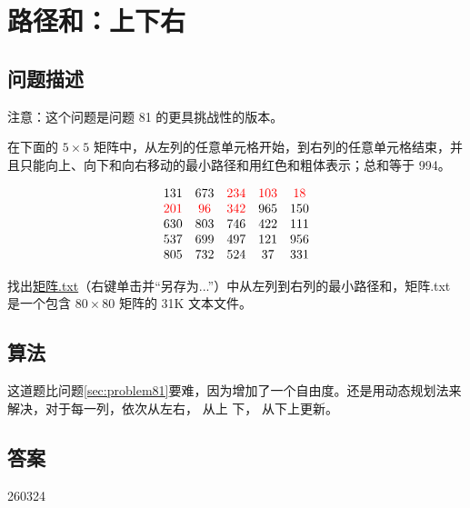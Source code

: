 \section{路径和：上下右}\label{sec:problem82}
\subsection{问题描述}
\begin{tcolorbox}

	注意：这个问题是问题 81 的更具挑战性的版本。

	在下面的 $5 \times 5$ 矩阵中，从左列的任意单元格开始，到右列的任意单元格结束，并且只能向上、向下和向右移动的最小路径和用红色和粗体表示；总和等于 994。

	\[
		\begin{array}{ccccc}
			131       & 673      & \textcolor{red}{234} & \textcolor{red}{103} & \textcolor{red}{18} \\
			\textcolor{red}{201} & \textcolor{red}{96} & \textcolor{red}{342} & 965       & 150      \\
			630       & 803      & 746       & 422       & 111      \\
			537       & 699      & 497       & 121       & 956      \\
			805       & 732      & 524       & 37        & 331      \\
		\end{array}
	\]

	找出\href{https://projecteuler.net/resources/documents/0082_matrix.txt}{矩阵.txt}（右键单击并“另存为...”）中从左列到右列的最小路径和，矩阵.txt 是一个包含 $80 \times 80$ 矩阵的 31K 文本文件。
\end{tcolorbox}

\subsection{算法}
这道题比问题\ref{sec:problem81}要难，因为增加了一个自由度。还是用动态规划法来解决，对于每一列，依次从左\to 右， 从上\to
下， 从下\to 上更新。
\subsection{答案}
260324
